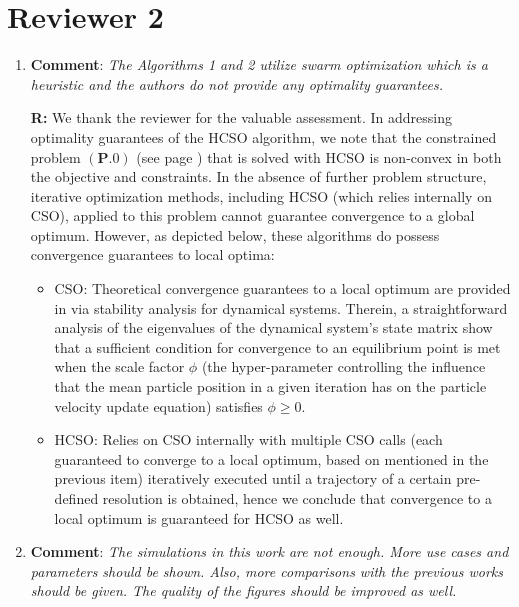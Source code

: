\documentclass[12pt, draftcls, onecolumn]{IEEEtran}
\theoremstyle{plain}
\theoremstyle{definition}
\theoremstyle{remark}
\begin{document}
\section*{Reviewer 2}
\begin{enumerate}
    \item \textbf{Comment}: \emph{The Algorithms 1 and 2 utilize swarm optimization which is a heuristic and the authors do not provide any optimality guarantees.}
    \vspace{2mm}
    
    \textbf{R:} We thank the reviewer for the valuable assessment. In addressing optimality guarantees of the HCSO algorithm, we note that the constrained problem $(\mathbf{P.0})$ (see page \pageref{eq:HeurMin}) that is solved with HCSO is non-convex in both the objective and constraints. In the absence of further problem structure, iterative optimization methods, including HCSO (which relies internally on CSO), applied to this problem cannot guarantee convergence to a global optimum. However, as depicted below, these algorithms do possess convergence guarantees to local optima:
    \begin{itemize}
        \item CSO: Theoretical convergence guarantees to a local optimum are provided in \cite{CSO} via stability analysis for dynamical systems. Therein, a straightforward analysis of the eigenvalues of the dynamical system's state matrix show that a sufficient condition for convergence to an equilibrium point is met when the scale factor $\phi$ (the hyper-parameter controlling the influence that the mean particle position in a given iteration has on the particle velocity update equation) satisfies $\phi{\geq}0$.
        \item HCSO: Relies on CSO internally with multiple CSO calls (each guaranteed to converge to a local optimum, based on \cite{CSO} mentioned in the previous item) iteratively executed until a trajectory of a certain pre-defined resolution is obtained, hence we conclude that convergence to a local optimum is guaranteed for HCSO as well.
    \end{itemize}
    \vspace{4mm}
    
    \item \textbf{Comment}: \emph{The simulations in this work are not enough. More use cases and parameters should be shown. Also, more comparisons with the previous works should be given. The quality of the figures should be improved as well.}
    \vspace{2mm}
    

\end{enumerate}
\end{document}

